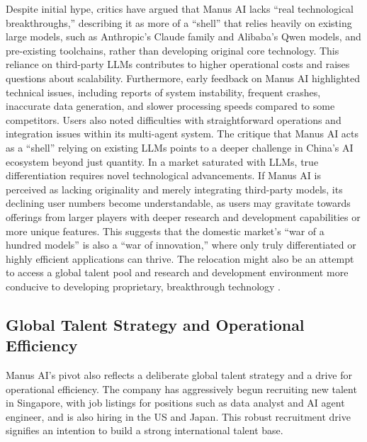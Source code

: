 Despite initial hype, critics have argued that Manus AI lacks ``real technological breakthroughs,'' describing it as more of a ``shell'' that relies heavily on existing large models, such as Anthropic's Claude family and Alibaba's Qwen models, and pre-existing toolchains, rather than developing original core technology.
This reliance on third-party LLMs contributes to higher operational costs and raises questions about scalability.
Furthermore, early feedback on Manus AI highlighted technical issues, including reports of system instability, frequent crashes, inaccurate data generation, and slower processing speeds compared to some competitors.
Users also noted difficulties with straightforward operations and integration issues within its multi-agent system.
The critique that Manus AI acts as a ``shell'' relying on existing LLMs points to a deeper challenge in China's AI ecosystem beyond just quantity.
In a market saturated with LLMs, true differentiation requires novel technological advancements.
If Manus AI is perceived as lacking originality and merely integrating third-party models, its declining user numbers become understandable, as users may gravitate towards offerings from larger players with deeper research and development capabilities or more unique features.
This suggests that the domestic market's ``war of a hundred models'' is also a ``war of innovation,'' where only truly differentiated or highly efficient applications can thrive.
The relocation might also be an attempt to access a global talent pool and research and development environment more conducive to developing proprietary, breakthrough technology \cite{weforum_china_ai_breakthroughs}.

\subsection{Global Talent Strategy and Operational Efficiency}

Manus AI's pivot also reflects a deliberate global talent strategy and a drive for operational efficiency.
The company has aggressively begun recruiting new talent in Singapore, with job listings for positions such as data analyst and AI agent engineer, and is also hiring in the US and Japan.
This robust recruitment drive signifies an intention to build a strong international talent base.

